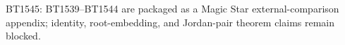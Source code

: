 \begin{center}\small
BT1545: BT1539--BT1544 are packaged as a Magic Star external-comparison appendix; identity, root-embedding, and Jordan-pair theorem claims remain blocked.
\end{center}
